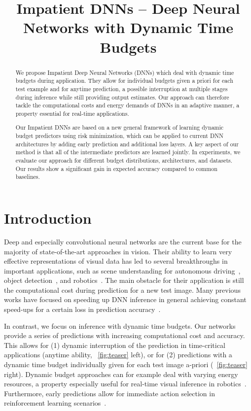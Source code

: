 \documentclass{bmvc2k}
\title{Impatient DNNs -- Deep Neural Networks with Dynamic Time Budgets}
\begin{document}
\maketitle

\begin{abstract}
    We propose Impatient Deep Neural Networks (DNNs) which deal with
    dynamic time budgets during application. They allow for individual budgets given 
    a priori for each test example and for anytime prediction, \ie a possible interruption at multiple
    stages during inference while still providing output estimates. 
    Our approach can therefore tackle the computational costs and energy demands 
    of DNNs in an adaptive manner, a property essential for real-time applications.

    Our Impatient DNNs are based on a new general framework of learning dynamic budget predictors
    using risk minimization, which can be applied to current DNN architectures
    by adding early prediction and additional loss layers. A key aspect of our method is that
    all of the intermediate predictors are learned jointly.
    In experiments, we evaluate our approach for different budget distributions,
    architectures, and datasets. Our results show a significant gain in expected accuracy compared
    to common baselines.
\end{abstract}

\section{Introduction}
\label{sec:intro}

Deep and especially convolutional neural networks are the current base for the majority
of state-of-the-art approaches in vision. Their ability to learn very
effective representations of visual data has led to several breakthroughs in important applications, such
as scene understanding for autonomous driving~\cite{cordts2016cityscapes}, object detection~\cite{girshick2014rich},
and robotics~\cite{finn2016deepspatial}.
The main obstacle for their application is still the computational cost
during prediction for a new test image. Many previous works have focused on speeding up DNN inference
in general achieving constant speed-ups for a certain loss in prediction accuracy~\cite{jaderberg2014speeding,lebedev2015fast}.

In contrast, we focus on inference with dynamic time budgets. Our networks provide a series of
predictions with increasing computational cost and accuracy. This allows for (1) dynamic interruption of the prediction
in time-critical applications (anytime ability, \figurename~\ref{fig:teaser} left), or for (2) predictions with a dynamic time budget individually given for each test image a-priori (\figurename~\ref{fig:teaser} right).
Dynamic budget approaches can for example deal with varying energy resources, a property especially useful for real-time visual inference
in robotics~\cite{levine2015end}. Furthermore, early predictions allow for immediate action selection in reinforcement learning scenarios~\cite{silver2013learning}.
\end{document}
